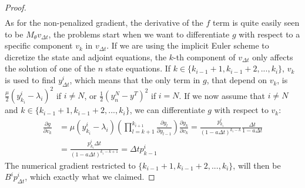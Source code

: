 \begin{proof}
\begin{align*}
\end{align*} 
As for the non-penalized gradient, the derivative of the $f$ term is quite easily seen to be $M_{\theta}v_{\Delta t}$, the problems start when we want to differentiate $g$ with respect to a specific component $v_k$ in $v_{\Delta t}$. If we are using the implicit Euler scheme to dicretize the state and adjoint equations, the $k$-th component of $v_{\Delta t}$ only affects the solution of one of the $n$ state equations. If $k\in \{k_{i-1}+1,k_{i-1}+2,...,k_{i}\}$, $v_k$ is used to find $y_{\Delta t}^i$, which means that the only term in $g$, that depend on $v_k$, is  $\frac{\mu }{2}(y_{k_i}^{i}-\lambda_i)^2$ if $i\neq N$, or $\frac{1}{2}(y_n^N-y^T)^2$ if $i=N$. If we now assume that $i\neq N$ and $k\in \{k_{i-1}+1,k_{i-1}+2,...,k_{i}\}$, we can differentiate $g$ with respect to $v_k$:
\begin{align*}
\frac{\partial g}{\partial v_k} &=\mu( y_{k_i}^{i}-\lambda_i) (\prod_{l=k+1}^{k_{i+1}}\frac{\partial y_{l}}{\partial y_{l-1}}) \frac{\partial y_k}{\partial v_{k}} = \frac{p_{k_i}^i}{(1-a\Delta t)^{k_{i}-k}}\frac{\Delta t}{1-a\Delta t} \\
&= \frac{p_{k_i}^i\Delta t}{(1-a\Delta t)^{k_i-k+1}}=\Delta t p_{k-1}^i
\end{align*}
The numerical gradient restricted to $ \{k_{i-1}+1,k_{i-1}+2,...,k_{i}\}$, will then be $B^ip_{\Delta t}^i$, which exactly what we claimed.
\end{proof}
